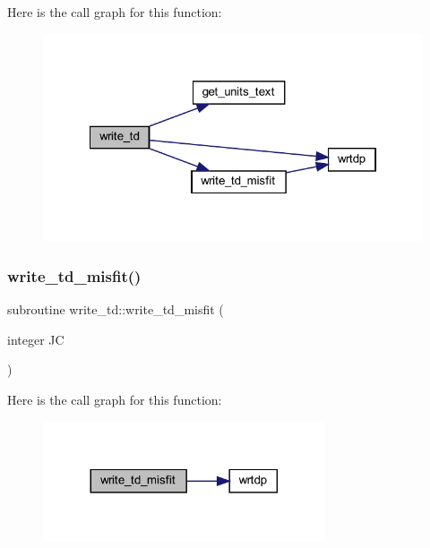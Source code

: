 Here is the call graph for this function\+:\nopagebreak
\begin{figure}[H]
\begin{center}
\leavevmode
\includegraphics[width=322pt]{Leroi__c_8f90_a050575d7cd77b6819922e9b6aa765af7_cgraph}
\end{center}
\end{figure}
\mbox{\label{Leroi__c_8f90_ae92c690eb0a03d9faf58627a9777375f}} 
\subsubsection{\texorpdfstring{write\+\_\+td\+\_\+misfit()}{write\_td\_misfit()}}
{\footnotesize\ttfamily subroutine write\+\_\+td\+::write\+\_\+td\+\_\+misfit (\begin{DoxyParamCaption}\item[{integer}]{JC }\end{DoxyParamCaption})}

Here is the call graph for this function\+:\nopagebreak
\begin{figure}[H]
\begin{center}
\leavevmode
\includegraphics[width=236pt]{Leroi__c_8f90_ae92c690eb0a03d9faf58627a9777375f_cgraph}
\end{center}
\end{figure}
\mbox{\label{Leroi__c_8f90_a6dd9c54049a223ff90b461f73c11015a}} 
